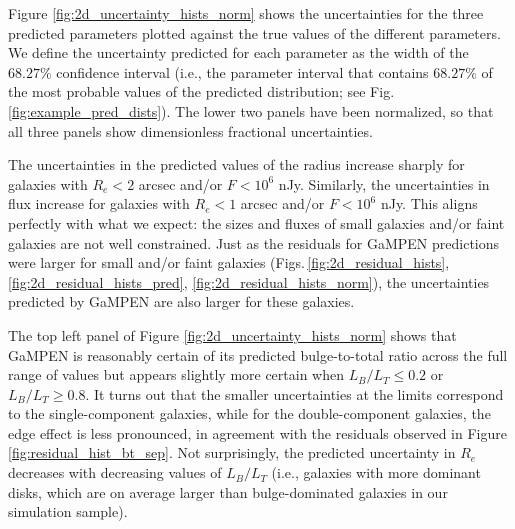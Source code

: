 \documentclass[twocolumn]{aastex63}
\newcommand\gampen{GaMPEN}
\begin{document}
\begin{CJK*}{UTF8}{gbsn}
Figure \ref{fig:2d_uncertainty_hists_norm} shows the uncertainties for the three predicted parameters plotted against the true values of the different parameters. 
We define the uncertainty predicted for each parameter as the width of the $68.27\%$ confidence interval (i.e., the parameter interval that contains $68.27\%$ of the most probable values of the predicted distribution; see Fig.\,\ref{fig:example_pred_dists}). 
The lower two panels have been normalized, so that all three panels show dimensionless fractional uncertainties.

The uncertainties in the predicted values of the radius increase sharply for galaxies with $R_e < 2$ arcsec and/or $F < 10^6$ nJy. Similarly, the uncertainties in flux increase for galaxies with $R_e < 1$ arcsec and/or $F < 10^6$ nJy. 
This aligns perfectly with what we expect: the sizes and fluxes of small galaxies and/or faint galaxies are not well constrained.
Just as the residuals for \gampen{} predictions were larger for small and/or faint galaxies (Figs.\,\ref{fig:2d_residual_hists}, \ref{fig:2d_residual_hists_pred}, \ref{fig:2d_residual_hists_norm}), the uncertainties predicted by \gampen{} are also larger for these galaxies.

The top left panel of Figure \ref{fig:2d_uncertainty_hists_norm} shows that \gampen{} is reasonably certain of its predicted %
bulge-to-total ratio across the full range of values but appears slightly more certain when $L_B/L_T \leq 0.2$ or $L_B/L_T \geq 0.8$. It turns out that the smaller uncertainties at the limits correspond to the single-component galaxies, while for the double-component galaxies, the edge effect is less pronounced, in agreement with the residuals observed in Figure \ref{fig:residual_hist_bt_sep}.
Not surprisingly, the predicted uncertainty in $R_e$ decreases with decreasing values of $L_B/L_T$ (i.e., galaxies with more dominant disks, which are on average larger than bulge-dominated galaxies in our simulation sample). 


\end{CJK*}
\end{document}
